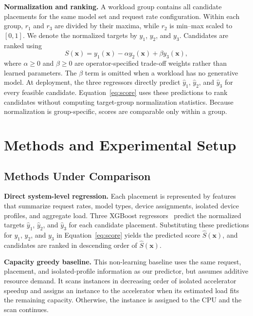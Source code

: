\documentclass{article}
\begin{document}
\textbf{Normalization and ranking.} A workload group contains all candidate placements for the same model set and request rate configuration. Within each group, $r_1$ and $r_3$ are divided by their maxima, while $r_2$ is min--max scaled to $[0,1]$. We denote the normalized targets by $y_1$, $y_2$, and $y_3$. Candidates are ranked using
\begin{equation}
S(\mathbf{x}) = y_1(\mathbf{x}) - \alpha y_2(\mathbf{x})
+ \beta y_3(\mathbf{x}),
\label{eq:score}
\end{equation}
where $\alpha \ge 0$ and $\beta \ge 0$ are operator-specified trade-off weights rather than learned parameters. The $\beta$ term is omitted when a workload has no generative model. At deployment, the three regressors directly predict $\hat y_1$, $\hat y_2$, and $\hat y_3$ for every feasible candidate. Equation~\eqref{eq:score} uses these predictions to rank candidates without computing target-group normalization statistics. 
Because normalization is group-specific, scores are comparable only within a group.


\section{Methods and Experimental Setup}
\label{sec:setup}

\subsection{Methods Under Comparison}
\label{sec:methods}


\textbf{Direct system-level regression.} Each placement is represented by features that summarize request rates, model types, device assignments, isolated device profiles, and aggregate load. Three XGBoost regressors~\citep{chen2016_xgboost} predict the normalized targets $\hat y_1$, $\hat y_2$, and $\hat y_3$ for each candidate placement. Substituting these predictions for $y_1$, $y_2$, and $y_3$ in Equation~\eqref{eq:score} yields the predicted score $\hat S(\mathbf{x})$, and candidates are ranked in descending order of $\hat S(\mathbf{x})$.

\textbf{Capacity greedy baseline.} This non-learning baseline uses the same request, placement, and isolated-profile information as our predictor, but assumes additive resource demand. It scans instances in decreasing order of isolated accelerator speedup and assigns an instance to the accelerator when its estimated load fits the remaining capacity. Otherwise, the instance is assigned to the CPU and the scan continues. 
\end{document}
